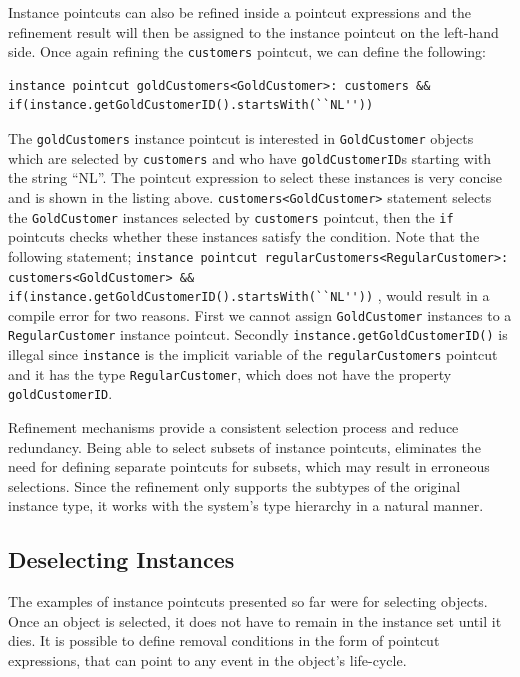 \documentclass{llncs}
\begin{document}
Instance pointcuts can also be refined inside a pointcut expressions and the refinement result will then be assigned to the instance pointcut on the left-hand side. Once again refining the \texttt{customers} pointcut, we can define the following:

\begin{lstlisting}[float=h!]
instance pointcut goldCustomers<GoldCustomer>: customers &&  if(instance.getGoldCustomerID().startsWith(``NL''))
\end{lstlisting}

The \texttt{goldCustomers} instance pointcut is interested in \texttt{GoldCustomer} objects which are selected by \texttt{customers} and who have \texttt{goldCustomerID}s starting with the string ``NL''. The pointcut expression to select these instances is very concise and is shown in the listing above. \texttt{customers<GoldCustomer>} statement selects the \texttt{GoldCustomer} instances selected by \texttt{customers} pointcut, then the \texttt{if} pointcuts checks whether these instances satisfy the condition. Note that the following statement; \lstinline!instance pointcut regularCustomers<RegularCustomer>: customers<GoldCustomer> &&  if(instance.getGoldCustomerID().startsWith(``NL''))! , would result in a compile error for two reasons. First we cannot assign \texttt{GoldCustomer} instances to a \texttt{RegularCustomer} instance pointcut. Secondly \texttt{instance.getGoldCustomerID()} is illegal since \texttt{instance} is the implicit variable of the \texttt{regularCustomers} pointcut and it has the type \texttt{RegularCustomer}, which does not have the property \texttt{goldCustomerID}.

Refinement mechanisms provide a consistent selection process and reduce redundancy. Being able to select subsets of instance pointcuts, eliminates the need for defining separate pointcuts for subsets, which may result in erroneous selections. Since the refinement only supports the subtypes of the original instance type, it works with the system's type hierarchy in a natural manner. 

\subsection{Deselecting Instances}
\label{sec:deselect}
The examples of instance pointcuts presented so far were for selecting objects. Once an object is selected, it does not have to remain in the instance set until it dies. It is possible to define removal conditions in the form of pointcut expressions, that can point to any event in the object's life-cycle.
\end{document}
